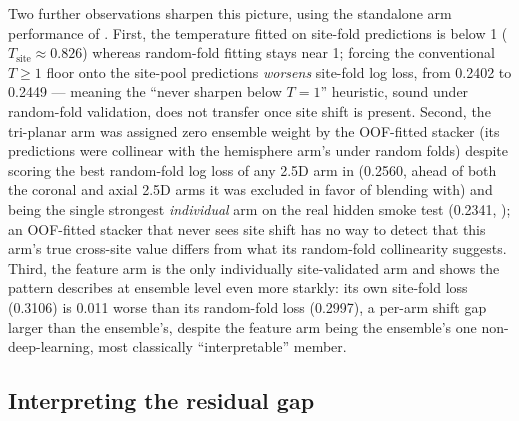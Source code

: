 \documentclass[11pt]{article}
\begin{document}
Two further observations sharpen this picture, using the standalone arm performance of . First, the temperature fitted on site-fold predictions is below 1 ($T_{\text{site}} \approx 0.826$) whereas random-fold fitting stays near 1; forcing the conventional $T \geq 1$ floor onto the site-pool predictions \emph{worsens} site-fold log loss, from 0.2402 to 0.2449 --- meaning the ``never sharpen below $T=1$'' heuristic, sound under random-fold validation, does not transfer once site shift is present. Second, the tri-planar arm was assigned zero ensemble weight by the OOF-fitted stacker (its predictions were collinear with the hemisphere arm's under random folds) despite scoring the best random-fold log loss of any 2.5D arm in  (0.2560, ahead of both the coronal and axial 2.5D arms it was excluded in favor of blending with) and being the single strongest \emph{individual} arm on the real hidden smoke test (0.2341, ); an OOF-fitted stacker that never sees site shift has no way to detect that this arm's true cross-site value differs from what its random-fold collinearity suggests. Third, the feature arm is the only individually site-validated arm and shows the pattern  describes at ensemble level even more starkly: its own site-fold loss (0.3106) is 0.011 worse than its random-fold loss (0.2997), a per-arm shift gap larger than the ensemble's, despite the feature arm being the ensemble's one non-deep-learning, most classically ``interpretable'' member.

\subsection{Interpreting the residual gap}
\end{document}
